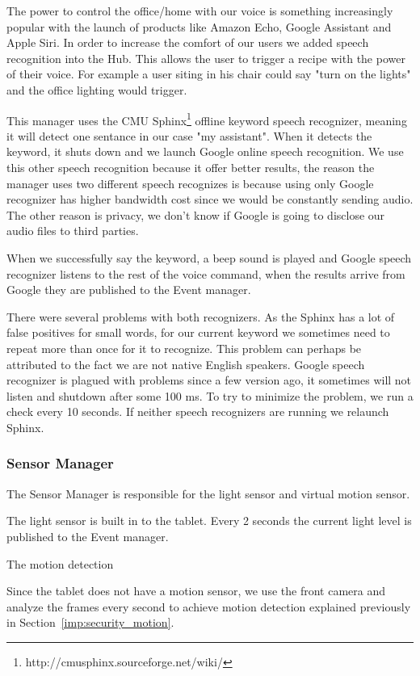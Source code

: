 The power to control the office/home with our voice is something increasingly popular with the launch of products like Amazon Echo, Google Assistant and Apple Siri. In order to increase the comfort of our users we added speech recognition into the Hub. This allows the user to trigger a recipe with the power of their voice. For example a user siting in his chair could say "turn on the lights" and the office lighting would trigger. 

This manager uses the CMU Sphinx\footnote{http://cmusphinx.sourceforge.net/wiki/} offline keyword speech recognizer, meaning it will detect one sentance in our case "my assistant". When it detects the keyword, it shuts down and we launch Google online speech recognition. We use this other speech recognition because it offer better results, the reason the manager uses two different speech recognizes is because using only Google recognizer has higher bandwidth cost since we would be constantly sending audio. The other reason is privacy, we don't know if Google is going to disclose our audio files to third parties.

When we successfully say the keyword, a beep sound is played and Google speech recognizer listens to the rest of the voice command, when the results arrive from Google they are published to the Event manager.

There were several problems with both recognizers. As the Sphinx has a lot of false positives for small words, for our current keyword we sometimes need to repeat more than once for it to recognize. This problem can perhaps be attributed to the fact we are not native English speakers. 
Google speech recognizer is plagued with problems since a few version ago, it sometimes will not listen and shutdown after some 100 ms. To try to minimize the problem, we run a check every 10 seconds. If neither speech recognizers are running we relaunch Sphinx.

\subsubsection{Sensor Manager}\label{sensor_manager_imp}

The Sensor Manager is responsible for the light sensor and virtual motion sensor.

The light sensor is built in to the tablet. Every 2 seconds the current light level is published to the Event manager. 

The motion detection 

Since the tablet does not have a motion sensor, we use the front camera and analyze the frames every second to achieve motion detection explained previously in Section~\ref{imp:security_motion}.

